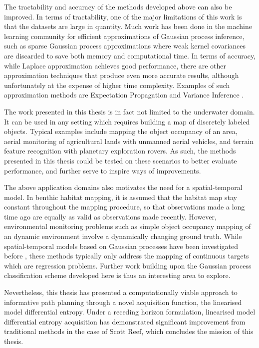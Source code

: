 		The tractability and accuracy of the methods developed above can also be improved. In terms of tractability, one of the major limitations of this work is that the datasets are large in quantity. Much work has been done in the machine learning community for efficient approximations of Gaussian process inference, such as sparse Gaussian process approximations where weak kernel covariances are discarded to save both memory and computational time. In terms of accuracy, while Laplace approximation achieves good performance, there are other approximation techniques that produce even more accurate results, although unfortunately at the expense of higher time complexity. Examples of such approximation methods are Expectation Propagation and Variance Inference \citep{GaussianProcessForMachineLearning}.
		
		The work presented in this thesis is in fact not limited to the underwater domain. It can be used in any setting which requires building a map of discretely labeled objects. Typical examples include mapping the object occupancy of an area, aerial monitoring of agricultural lands with unmanned aerial vehicles, and terrain feature recognition with planetary exploration rovers. As such, the methods presented in this thesis could be tested on these scenarios to better evaluate performance, and further serve to inspire ways of improvements.
		
		The above application domains also motivates the need for a spatial-temporal model. In benthic habitat mapping, it is assumed that the habitat map stay constant throughout the mapping procedure, so that observations made a long time ago are equally as valid as observations made recently. However, environmental monitoring problems such as simple object occupancy mapping of an dynamic environment involve a dynamically changing ground truth. While spatial-temporal models based on Gaussian processes have been investigated before \citep{Roman:SequentialBayesianOptimisation}, these methods typically only address the mapping of continuous targets which are regression problems. Further work building upon the Gaussian process classification scheme developed here is thus an interesting area to explore.
		
		Nevertheless, this thesis has presented a computationally viable approach to informative path planning through a novel acquisition function, the linearised model differential entropy. Under a receding horizon formulation, linearised model differential entropy acquisition has demonstrated significant improvement from traditional methods in the case of Scott Reef, which concludes the mission of this thesis.

	
